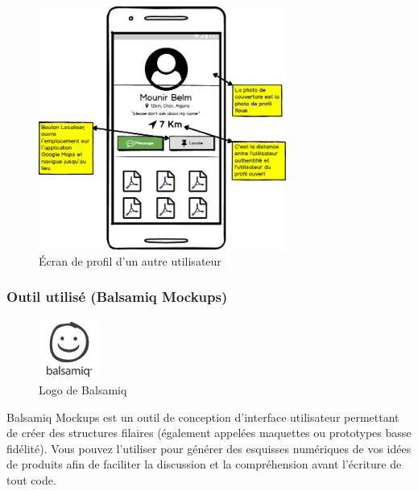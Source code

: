 \begin{figure}[H]
	\centering
		\includegraphics[height=8cm]{Images/chapter3/wireframe/other_profile.png}
		\caption{{\footnotesize Écran de profil d'un autre utilisateur}}
\end{figure}

\newpage

\subsubsection{Outil utilisé (Balsamiq Mockups)}

\begin{figure}
	\includegraphics[width=2cm]{Images/chapter3/balsamiq_logo.png}
	\vspace{-20pt}
	\caption{{\footnotesize Logo de Balsamiq}}
\end{figure}

Balsamiq Mockups est un outil de conception d'interface utilisateur permettant de créer des structures filaires (également appelées maquettes ou prototypes basse fidélité). Vous pouvez l'utiliser pour générer des esquisses numériques de vos idées de produits afin de faciliter la discussion et la compréhension avant l'écriture de tout code.\cite{noauthor_balsamiq_nodate}\\\\

